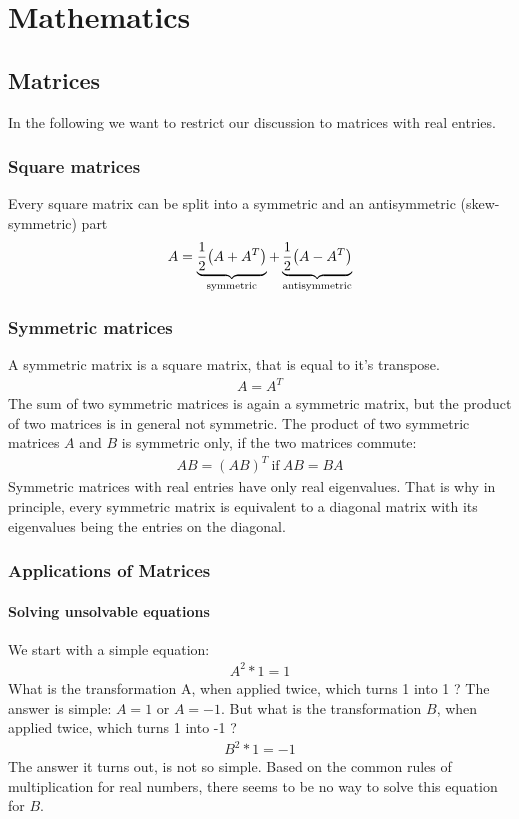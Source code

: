 \chapter{Mathematics}

\section{Matrices}

In the following we want to restrict our discussion to matrices with
real entries.

\subsection{Square matrices}
Every square matrix can be split into a symmetric and an antisymmetric
(skew-symmetric) part 
\begin{align}
A=\underbrace{\frac{1}{2}{ \left( A + A^T \right) }}_{\text{symmetric}}
+\underbrace{\frac{1}{2}{ \left( A - A^T \right) }}_{\text{antisymmetric}}
\end{align}


\subsection{Symmetric matrices}

A symmetric matrix is a square matrix, that is equal to it's transpose.
\begin{align}
A = A^T
\end{align} 
The sum of two symmetric matrices is again a symmetric matrix, but
the product of two matrices is in general not symmetric. The product of
two symmetric matrices $A$ and $B$ is symmetric only, if the two
matrices commute: 
\begin{align}
AB = (AB)^T \ \text{if}\ AB = BA
\end{align} 
Symmetric matrices with real entries have only real eigenvalues. That
is why in principle, every symmetric matrix is equivalent to a diagonal
matrix with its eigenvalues being the entries on the diagonal.

\subsection{Applications of Matrices}
\subsubsection{Solving unsolvable equations}

We start with a simple equation: 
\begin{align}
A^2 * 1 = 1 
\end{align} 
What is the transformation A, when applied twice, which turns 1 into
1 ? The answer is simple: $A=1$ or $A=-1$. But what is the
transformation $B$, when applied twice, which turns 1 into -1 ? 
\begin{align}
B^2 * 1 = -1 
\end{align} 
The answer it turns out, is not so simple. Based on the common rules
of multiplication for real numbers, there seems to be no way to solve
this equation for $B$.

